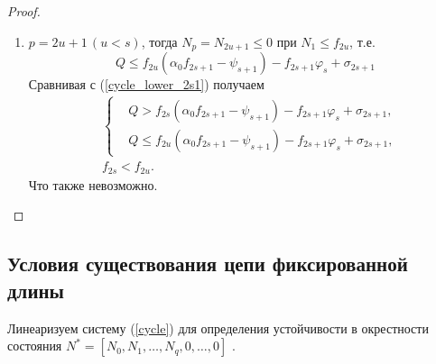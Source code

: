 \begin{proof}
\begin{enumerate}
\begin{enumerate}
            \item \(p = 2u+1 \, (u < s)\), тогда \( N_p = N_{2u+1} \leq 0 \) при \(N_1 \leq f_{2u} \), т.е. 
            \begin{equation*}
                Q \leq f_{2u} ( \alpha_0 f_{2s+1} - \psi_{s+1} ) - f_{2s+1} \varphi_s + \sigma_{2s+1}
            \end{equation*}
            Сравнивая с (\ref{cycle_lower_2s1}) получаем
            \begin{equation*}
                \begin{split}
                & \left\{ \begin{split}
                    & Q > f_{2s} ( \alpha_0 f_{2s+1}  - \psi_{s+1} ) - f_{2s+1} \varphi_s + \sigma_{2s+1}, \\
                    & Q \leq f_{2u} ( \alpha_0 f_{2s+1} - \psi_{s+1} ) - f_{2s+1} \varphi_s + \sigma_{2s+1},
                \end{split} \right. \\
                & f_{2s} < f_{2u}.
                \end{split}
            \end{equation*}
            Что также невозможно. 
        \end{enumerate}
    \end{enumerate}
\end{proof}

\subsection{Условия существования цепи фиксированной длины}

Линеаризуем систему (\ref{cycle}) для определения устойчивости в окрестности состояния \(N^* = [ N_0, N_1, \dots, N_q, 0, \dots, 0 ]\) .

